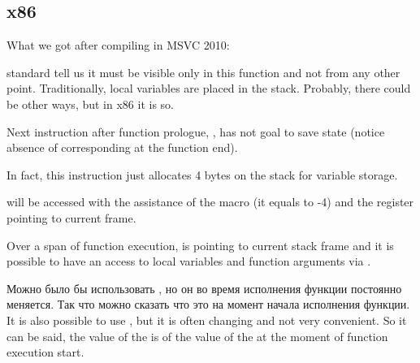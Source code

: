﻿\subsection{x86}

{What we got after compiling in MSVC 2010:}




{\CCpp standard tell us it must be visible only in this function and not from any other point. 
Traditionally, local variables are placed in the stack. 
Probably, there could be other ways, but in x86 it is so.}

{Next instruction after function prologue, , has not goal to save \ECX state 
(notice absence of corresponding  at the function end).}

{In fact, this instruction just allocates 4 bytes on the stack for  variable storage.} 

{ will be accessed with the assistance of the  macro 
(it equals to -4) and the \EBP register pointing to current frame.}

{Over a span of function execution, \EBP is pointing to current stack frame and it is possible 
to have an access to local variables and function arguments via .}

\IFRU
{Можно было бы использовать \ESP, но он во время исполнения функции постоянно меняется. 
Так что можно сказать что \EBP это  \ESP на момент начала исполнения функции.}
{It is also possible to use \ESP, but it is often changing and not very convenient.
So it can be said, the value of the \EBP is  of the value of the \ESP at the moment of function execution start.}

